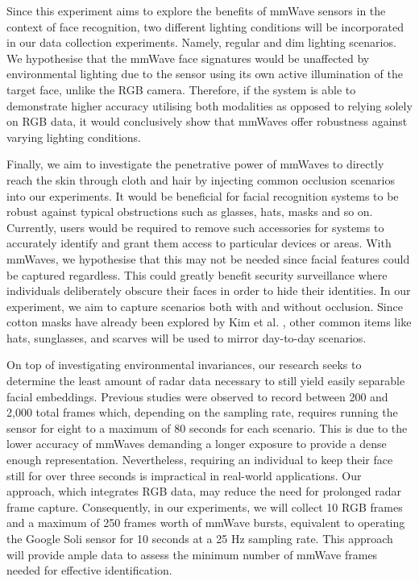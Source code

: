 \documentclass{mpaper}
\begin{document}
Since this experiment aims to explore the benefits of mmWave sensors in the context of face recognition, two different lighting conditions will be incorporated in our data collection experiments. Namely, regular and dim lighting scenarios. We hypothesise that the mmWave face signatures would be unaffected by environmental lighting due to the sensor using its own active illumination of the target face, unlike the RGB camera. Therefore, if the system is able to demonstrate higher accuracy utilising both modalities as opposed to relying solely on RGB data, it would conclusively show that mmWaves offer robustness against varying lighting conditions.

Finally, we aim to investigate the penetrative power of mmWaves to directly reach the skin through cloth and hair by injecting common occlusion scenarios into our experiments. It would be beneficial for facial recognition systems to be robust against typical obstructions such as glasses, hats, masks and so on. Currently, users would be required to remove such accessories for systems to accurately identify and grant them access to particular devices or areas. With mmWaves, we hypothesise that this may not be needed since facial features could be captured regardless. This could greatly benefit security surveillance where individuals deliberately obscure their faces in order to hide their identities. In our experiment, we aim to capture scenarios both with and without occlusion. Since cotton masks have already been explored by Kim et al. \cite{kim2020face}, other common items like hats, sunglasses, and scarves will be used to mirror day-to-day scenarios.

On top of investigating environmental invariances, our research seeks to determine the least amount of radar data necessary to still yield easily separable facial embeddings. Previous studies were observed to record between 200 and 2,000 total frames which, depending on the sampling rate, requires running the sensor for eight to a maximum of 80 seconds for each scenario. This is due to the lower accuracy of mmWaves demanding a longer exposure to provide a dense enough representation. Nevertheless, requiring an individual to keep their face still for over three seconds is impractical in real-world applications. Our approach, which integrates RGB data, may reduce the need for prolonged radar frame capture. Consequently, in our experiments, we will collect 10 RGB frames and a maximum of 250 frames worth of mmWave bursts, equivalent to operating the Google Soli sensor for 10 seconds at a 25 Hz sampling rate. This approach will provide ample data to assess the minimum number of mmWave frames needed for effective identification. 
\end{document}
